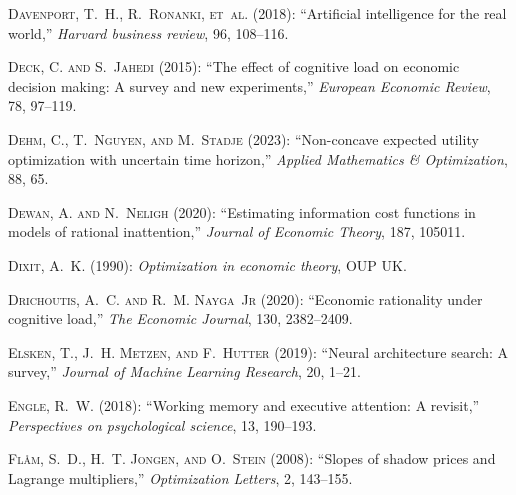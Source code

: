 \documentclass[11pt]{article}
\theoremstyle{definition}
\theoremstyle{remark}
\begin{document}
\begin{thebibliography}{70}
\textsc{Davenport, T.~H., R.~Ronanki, et~al.} (2018): \enquote{Artificial intelligence for the real world,} \emph{Harvard business review}, 96, 108--116.

\textsc{Deck, C. and S.~Jahedi} (2015): \enquote{The effect of cognitive load on economic decision making: A survey and new experiments,} \emph{European Economic Review}, 78, 97--119.

\textsc{Dehm, C., T.~Nguyen, and M.~Stadje} (2023): \enquote{Non-concave expected utility optimization with uncertain time horizon,} \emph{Applied Mathematics \& Optimization}, 88, 65.

\textsc{Dewan, A. and N.~Neligh} (2020): \enquote{Estimating information cost functions in models of rational inattention,} \emph{Journal of Economic Theory}, 187, 105011.

\textsc{Dixit, A.~K.} (1990): \emph{Optimization in economic theory}, OUP UK.

\textsc{Drichoutis, A.~C. and R.~M. Nayga~Jr} (2020): \enquote{Economic rationality under cognitive load,} \emph{The Economic Journal}, 130, 2382--2409.

\textsc{Elsken, T., J.~H. Metzen, and F.~Hutter} (2019): \enquote{Neural architecture search: A survey,} \emph{Journal of Machine Learning Research}, 20, 1--21.

\textsc{Engle, R.~W.} (2018): \enquote{Working memory and executive attention: A revisit,} \emph{Perspectives on psychological science}, 13, 190--193.

\textsc{Fl{\aa}m, S.~D., H.~T. Jongen, and O.~Stein} (2008): \enquote{Slopes of shadow prices and Lagrange multipliers,} \emph{Optimization Letters}, 2, 143--155.


\end{thebibliography}
\end{document}
